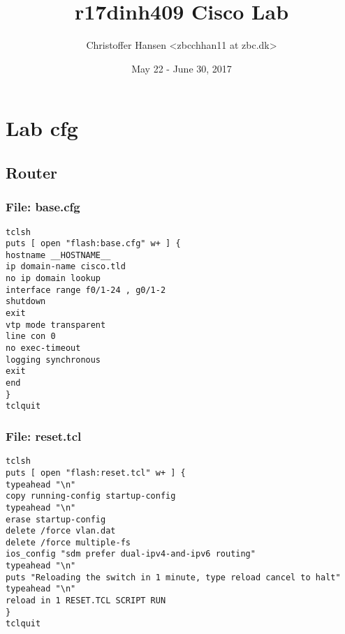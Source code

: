 \documentclass{article}
\begin{document}
\title{r17dinh409 Cisco Lab}
\author{Christoffer Hansen <zbcchhan11 at zbc.dk>}
\date{May 22 - June 30, 2017}
\maketitle

\newpage
\tableofcontents


%
%
\section{Lab cfg}


\subsection{Router}


\subsubsection{File: base.cfg}

\begin{verbatim}
tclsh
puts [ open "flash:base.cfg" w+ ] {
hostname __HOSTNAME__
ip domain-name cisco.tld
no ip domain lookup
interface range f0/1-24 , g0/1-2
shutdown
exit
vtp mode transparent
line con 0
no exec-timeout
logging synchronous
exit
end
}
tclquit
\end{verbatim}


\subsubsection{File: reset.tcl}

\begin{verbatim}
tclsh
puts [ open "flash:reset.tcl" w+ ] {
typeahead "\n"
copy running-config startup-config
typeahead "\n"
erase startup-config
delete /force vlan.dat
delete /force multiple-fs
ios_config "sdm prefer dual-ipv4-and-ipv6 routing"
typeahead "\n"
puts "Reloading the switch in 1 minute, type reload cancel to halt"
typeahead "\n"
reload in 1 RESET.TCL SCRIPT RUN
}
tclquit
\end{verbatim}
\end{document}
